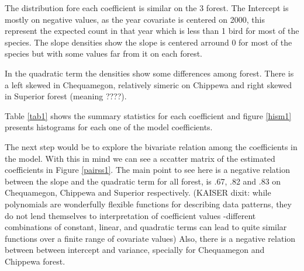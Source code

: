 \documentclass{article}
\begin{document}
The distribution fore each coefficient is similar on the 3 forest. The Intercept is mostly on negative values, as the year covariate is centered on 2000, this represent the expected count in that year which is  less than 1 bird for most of the species. The slope densities show the slope is centered arround 0 for most of the species but with some values far from it on each forest. 

In the quadratic term the densities show some differences among forest. There is a left skewed in Chequamegon, relatively simeric on Chippewa and right skewed in Superior forest (meaning ????). 

Table \ref{tab1} shows the summary statistics for each coefficient and figure \ref{hism1} presents histograms for each one of the model coefficients.


The next step would be to explore the bivariate relation among the coefficients in the model. With this in mind we can see a sccatter matrix of the estimated coefficients in Figure \ref{pairss1}. The main point to see here is a negative relation between the slope and the quadratic term for all forest, is .67, .82 and .83 on Chequamegon, Chippewa and Superior respectively. (KAISER dixit: while polynomials are wonderfully flexible functions for describing data patterns, they do not lend themselves to interpretation of coefficient values -different combinations of constant, linear, and quadratic terms can lead to quite similar functions over a finite range of covariate values) 
Also, there is a negative relation between between intercept and variance, specially for Chequamegon and Chippewa forest. 
\end{document}
